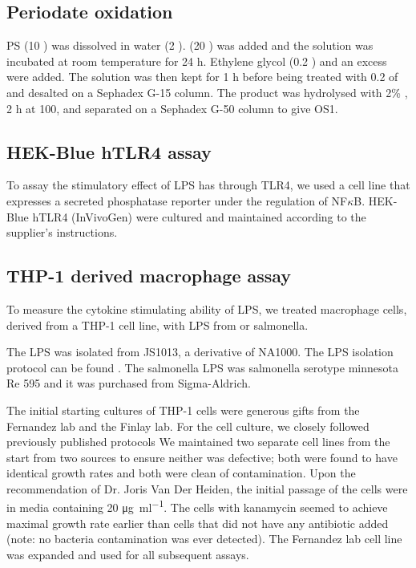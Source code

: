       \subsection{Periodate oxidation} %
      \label{sub:periodate_oxidation}

      \ac{PS} (10 \milligram) was dissolved in water (2 \millilitre).  (20 \milligram) was
      added and the solution was incubated at room temperature for 24 h. Ethylene glycol (0.2
      \millilitre) and an excess  were added. The solution was then kept for 1 h before being
      treated with 0.2 \millilitre of  and desalted on a Sephadex G-15 column. The product was
      hydrolysed with 2\% , 2 h at 100\cel, and separated on a Sephadex G-50 column to give
      \ac{OS}1.
      
      \subsection{HEK-Blue hTLR4 assay}\label{sec:hek-blue-htlr4}
      To assay the stimulatory effect of \caulobacter{} \ac{LPS}  has through TLR4, we used a cell line that expresses a secreted phosphatase reporter under the regulation of NF$\kappa$B.
      HEK-Blue hTLR4\texttrademark{} (InVivoGen) were cultured and maintained according to the supplier's instructions. 
      
      \subsection{THP-1 derived macrophage assay} \label{sec:thp-1-derived}
      To measure the cytokine stimulating ability of \caulobacter{} \ac{LPS}, we treated macrophage cells, derived from a THP-1 cell line, with \ac{LPS} from \caulobacter{} or \ac{salmonella}. 
      
      The \caulobacter{} \ac{LPS} was isolated from \caulobacter{} JS1013, a derivative of NA1000. The \ac{LPS} isolation protocol can be found . The \ac{salmonella} \ac{LPS} was \ac{salmonella} serotype minnesota Re 595 and it was purchased from Sigma-Aldrich.
      
      The initial starting cultures of THP-1 cells were generous gifts from the Fernandez lab and the Finlay lab. For the cell culture, we closely followed previously published protocols We maintained two separate cell lines from the start from two sources to ensure neither was defective; both were found to have identical growth rates and both were clean of contamination. Upon the recommendation of Dr. Joris Van Der Heiden, the initial passage of the cells were in media containing 20 \si{\micro\gram\per\milli\litre}. The cells with kanamycin seemed to achieve maximal growth rate earlier than cells that did not have any antibiotic added (note: no bacteria contamination was ever detected). The Fernandez lab cell line was expanded and used for all subsequent assays.
      
